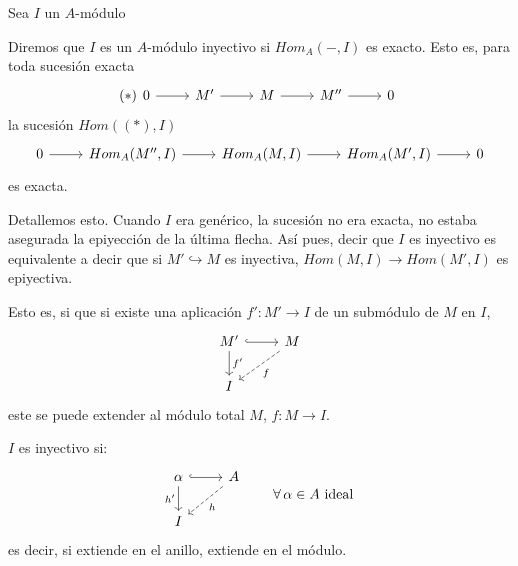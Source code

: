     Sea $I$ un $A$-m\'odulo
\begin{defi}
Diremos que $I$ es un $A$-m\'odulo inyectivo si $Hom_A(-,I)$ es exacto. Esto es, para toda sucesi\'on exacta
$$(*) \bt 0 \rar & M'  \rar & M  \rar & M''  \rar & 0 \et$$
la sucesi\'on $Hom((*), I)$ 
$$\bt 0 \rar & Hom_A(M'',I)  \rar & Hom_A(M,I)  \rar & Hom_A(M',I)  \rar & 0 \et$$
es exacta.
\end{defi}
\begin{obs}
    Detallemos esto. Cuando $I$ era gen\'erico, la sucesi\'on no era exacta, no estaba asegurada la epiyecci\'on de la \'ultima flecha. As\'i pues, decir que $I$ es inyectivo es equivalente a decir que si $M'\hookrightarrow M$ es inyectiva, $Hom(M,I) \longrightarrow Hom(M',I)$ es epiyectiva. 

    Esto es, si que si existe una aplicaci\'on $f': M' \longrightarrow I$ de un subm\'odulo de $M$ en $I$, 
    $$\bt M' \arrow{d}{f'} \arrow[hook]{r} & M \arrow[dashed]{dl}{f} \\ I \et$$
    este se puede extender al m\'odulo total $M$, $f: M \longrightarrow I$.
\end{obs}
\begin{custom}
     $I$ es inyectivo si:
    $$\bt \alpha \arrow[hook]{r} \arrow[swap]{d}{h'}& A\arrow[dashed]{dl}{h}  \\ I \et \qquad \forall \, \alpha \in A \text{ ideal }$$
    es decir, si extiende en el anillo, extiende en el m\'odulo. 
\end{custom}
